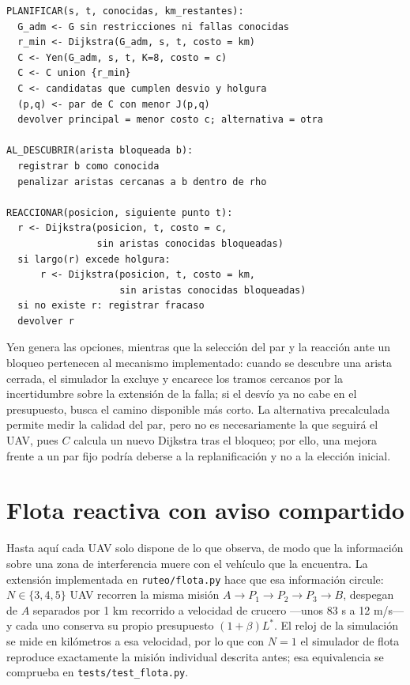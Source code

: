 \documentclass[journal,10pt]{IEEEtran}
\begin{document}
\begin{lstlisting}[caption={Pseudocódigo del mecanismo implementado; cada tramo une dos puntos consecutivos de la misión.},label={alg:propuesta}]
PLANIFICAR(s, t, conocidas, km_restantes):
  G_adm <- G sin restricciones ni fallas conocidas
  r_min <- Dijkstra(G_adm, s, t, costo = km)
  C <- Yen(G_adm, s, t, K=8, costo = c)
  C <- C union {r_min}
  C <- candidatas que cumplen desvio y holgura
  (p,q) <- par de C con menor J(p,q)
  devolver principal = menor costo c; alternativa = otra

AL_DESCUBRIR(arista bloqueada b):
  registrar b como conocida
  penalizar aristas cercanas a b dentro de rho

REACCIONAR(posicion, siguiente punto t):
  r <- Dijkstra(posicion, t, costo = c,
                sin aristas conocidas bloqueadas)
  si largo(r) excede holgura:
      r <- Dijkstra(posicion, t, costo = km,
                    sin aristas conocidas bloqueadas)
  si no existe r: registrar fracaso
  devolver r
\end{lstlisting}

Yen genera las opciones, mientras que la selección del par y la reacción
ante un bloqueo pertenecen al mecanismo implementado: cuando se descubre
una arista cerrada, el simulador la excluye y encarece los tramos cercanos
por la incertidumbre sobre la extensión de la falla; si el desvío ya no
cabe en el presupuesto, busca el camino disponible más corto. La
alternativa precalculada permite medir la calidad del par, pero no es
necesariamente la que seguirá el UAV, pues $C$ calcula un nuevo Dijkstra
tras el bloqueo; por ello, una mejora frente a un par fijo podría deberse
a la replanificación y no a la elección inicial.

\section{Flota reactiva con aviso compartido}
\label{sec:flota}

Hasta aquí cada UAV solo dispone de lo que observa, de modo que la
información sobre una zona de interferencia muere con el vehículo que la
encuentra. La extensión implementada en \texttt{ruteo/flota.py} hace que esa
información circule: $N\in\{3,4,5\}$ UAV recorren la misma misión
$A\!\to\!P_1\!\to\!P_2\!\to\!P_3\!\to\!B$, despegan de $A$ separados por
1 km recorrido a velocidad de crucero ---unos 83 s a 12 m/s--- y cada uno
conserva su propio presupuesto $(1+\beta)L^*$. El reloj de la simulación se
mide en kilómetros a esa velocidad, por lo que con $N=1$ el simulador de
flota reproduce exactamente la misión individual descrita antes; esa
equivalencia se comprueba en \texttt{tests/test\_flota.py}.
\end{document}
